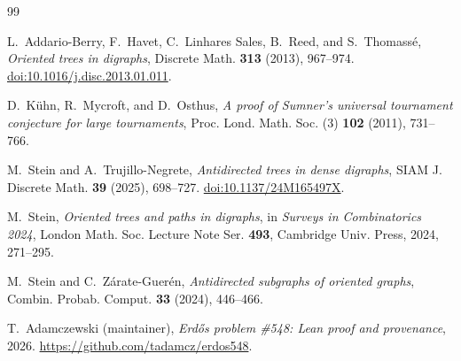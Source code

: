 \documentclass[11pt]{article}
\numberwithin{equation}{section}
\theoremstyle{definition}
\begin{document}
\begin{thebibliography}{99}

L.~Addario-Berry, F.~Havet, C.~Linhares Sales, B.~Reed, and S.~Thomass\'e,
\emph{Oriented trees in digraphs},
Discrete Math. \textbf{313} (2013), 967--974.
\href{https://doi.org/10.1016/j.disc.2013.01.011}
{doi:10.1016/j.disc.2013.01.011}.

D.~K\"uhn, R.~Mycroft, and D.~Osthus,
\emph{A proof of Sumner's universal tournament conjecture for large
tournaments},
Proc. Lond. Math. Soc. (3) \textbf{102} (2011), 731--766.

M.~Stein and A.~Trujillo-Negrete,
\emph{Antidirected trees in dense digraphs},
SIAM J. Discrete Math. \textbf{39} (2025), 698--727.
\href{https://doi.org/10.1137/24M165497X}{doi:10.1137/24M165497X}.

M.~Stein,
\emph{Oriented trees and paths in digraphs},
in \emph{Surveys in Combinatorics 2024},
London Math. Soc. Lecture Note Ser. \textbf{493},
Cambridge Univ. Press, 2024, 271--295.

M.~Stein and C.~Z\'arate-Guer\'en,
\emph{Antidirected subgraphs of oriented graphs},
Combin. Probab. Comput. \textbf{33} (2024), 446--466.

T.~Adamczewski (maintainer),
\emph{Erd\H{o}s problem \#548: Lean proof and provenance}, 2026.
\url{https://github.com/tadamcz/erdos548}.

\end{thebibliography}
\end{document}
